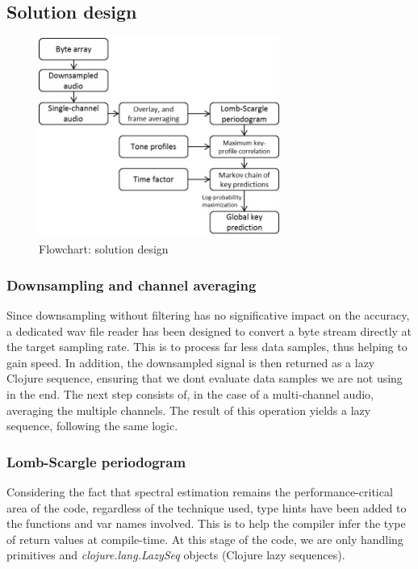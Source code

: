 \documentclass[letterpaper]{article}
\begin{document}
\subsection{Solution design}

\begin{figure}[h!]
\begin{center}
\includegraphics[width=3.1in,angle=0]{imgs/flowChart.png}
\caption{Flowchart: solution design}
\label{fig3}
\end{center}
\end{figure}

\subsubsection{Downsampling and channel averaging}

Since downsampling without filtering has no significative impact on the accuracy, a dedicated wav file reader has been designed to convert a byte stream directly
at the target sampling rate. This is to process far less data samples, thus helping to gain speed. In addition, the downsampled signal is then returned as
a lazy Clojure sequence, ensuring that we don\textquotesingle t evaluate data samples we are not using in the end.
The next step consists of, in the case of a multi-channel audio, averaging the multiple channels. The result of this operation yields a lazy sequence, following
the same logic.

\subsubsection{Lomb-Scargle periodogram}

Considering the fact that spectral estimation remains the performance-critical area of the code, regardless of the technique used, type hints have been added to the functions and var names involved. This is to help the compiler infer the type of return values at compile-time.
At this stage of the code, we are only handling primitives and \textit{clojure.lang.LazySeq} objects (Clojure lazy sequences).\\
\end{document}
